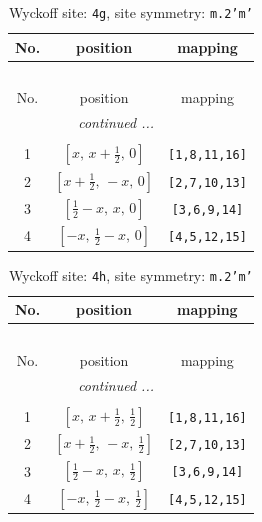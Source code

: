 \documentclass[fleqn,8pt]{jsarticle}
\begin{document}
\renewcommand{\arraystretch}{1.2}
\begin{longtable}{ccc}
\caption{Wyckoff site: {\tt 4g}, site symmetry: {\tt m.2'm'}}
 \\
 \hline \hline
No. & position & mapping \\ \hline \endfirsthead

\multicolumn{2}{l}{\tablename\ \thetable{}} \\
 \hline \hline
No. & position & mapping \\ \hline \endhead

 \hline \hline
\multicolumn{2}{r}{\footnotesize\it continued ...} \\ \endfoot

 \hline \hline
\multicolumn{2}{r}{} \\ \endlastfoot

1 & $\left[ x,\, x + \frac{1}{2},\, 0 \right]$ & {\tt [1,8,11,16]} \\ \hline
2 & $\left[ x + \frac{1}{2},\, - x,\, 0 \right]$ & {\tt [2,7,10,13]} \\ \hline
3 & $\left[ \frac{1}{2} - x,\, x,\, 0 \right]$ & {\tt [3,6,9,14]} \\ \hline
4 & $\left[ - x,\, \frac{1}{2} - x,\, 0 \right]$ & {\tt [4,5,12,15]} \\
\end{longtable}
\renewcommand{\arraystretch}{1.2}
\begin{longtable}{ccc}
\caption{Wyckoff site: {\tt 4h}, site symmetry: {\tt m.2'm'}}
 \\
 \hline \hline
No. & position & mapping \\ \hline \endfirsthead

\multicolumn{2}{l}{\tablename\ \thetable{}} \\
 \hline \hline
No. & position & mapping \\ \hline \endhead

 \hline \hline
\multicolumn{2}{r}{\footnotesize\it continued ...} \\ \endfoot

 \hline \hline
\multicolumn{2}{r}{} \\ \endlastfoot

1 & $\left[ x,\, x + \frac{1}{2},\, \frac{1}{2} \right]$ & {\tt [1,8,11,16]} \\ \hline
2 & $\left[ x + \frac{1}{2},\, - x,\, \frac{1}{2} \right]$ & {\tt [2,7,10,13]} \\ \hline
3 & $\left[ \frac{1}{2} - x,\, x,\, \frac{1}{2} \right]$ & {\tt [3,6,9,14]} \\ \hline
4 & $\left[ - x,\, \frac{1}{2} - x,\, \frac{1}{2} \right]$ & {\tt [4,5,12,15]} \\
\end{longtable}
\end{document}

